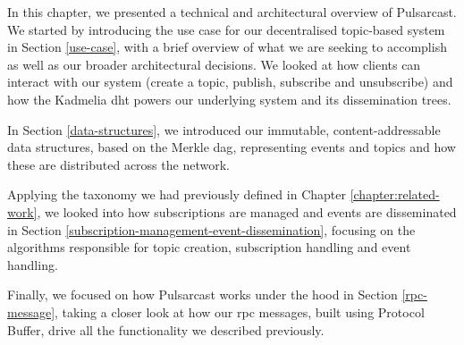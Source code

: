 In this chapter, we presented a technical and architectural overview of
Pulsarcast. We started by introducing the use case for our decentralised
topic-based system in Section \ref{use-case}, with a brief overview of what we
are seeking to accomplish as well as our broader architectural decisions. We
looked at how clients can interact with our system (create a topic, publish,
subscribe and unsubscribe) and how the Kadmelia \acrshort{dht} powers our
underlying system and its dissemination trees.

In Section \ref{data-structures}, we introduced our immutable,
content-addressable data structures, based on the Merkle \acrshort{dag},
representing events and topics and how these are distributed across the
network.

Applying the taxonomy we had previously defined in Chapter
\ref{chapter:related-work}, we looked into how subscriptions are managed and
events are disseminated in Section
\ref{subscription-management-event-dissemination}, focusing on the algorithms
responsible for topic creation, subscription handling and event handling.

Finally, we focused on how Pulsarcast works under the hood in Section
\ref{rpc-message}, taking a closer look at how our \acrshort{rpc} messages,
built using Protocol Buffer, drive all the functionality we described
previously.


